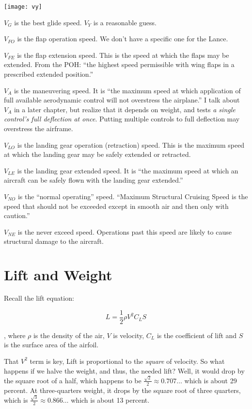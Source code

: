 \texttt{[image: vy]}

$V_G$ is the best glide speed. $V_Y$ is a reasonable guess.

$V_{FO}$ is the flap operation speed. We don't have a specific one for the Lance.

$V_{FE}$ is the flap extension speed. This is the speed at which the flaps may be extended. From the POH: ``the highest speed permissible with wing flaps in a prescribed extended position.''

$V_A$ is the maneuvering speed. It is ``the maximum speed at which application of full available aerodynamic control will not overstress the airplane.'' I talk about $V_A$ in a later chapter, but realize that it depends on weight, and tests \emph{a single control's full deflection at once}. Putting multiple controls to full deflection may overstress the airframe.

$V_{LO}$ is the landing gear operation (retraction) speed. This is the maximum speed at which the landing gear may be safely extended or retracted.

$V_{LE}$ is the landing gear extended speed. It is ``the maximum speed at which an aircraft can be safely flown with the landing gear extended.''

$V_{NO}$ is the ``normal operating'' speed. ``Maximum Structural Cruising Speed is the speed that should not be exceeded except in smooth air and then only with caution.''

$V_{NE}$ is the never exceed speed. Operations past this speed are likely to cause structural damage to the aircraft.

\section{Lift and Weight}

Recall the lift equation:

\begin{equation}
L = \frac{1}{2} \rho V^2 C_L S
\end{equation}

, where $\rho$ is the density of the air, $V$ is velocity, $C_L$ is the coefficient of lift and $S$ is the surface area of the airfoil.

That $V^2$ term is key, Lift is proportional to the \emph{square} of velocity. So what happens if we halve the weight, and thus, the needed lift? Well, it would drop by the square root of a half, which happens to be $\frac{\sqrt{2}}{2} \approx 0.707\ldots$ which is about 29 percent. At three-quarters weight, it drops by the square root of three quarters, which is $\frac{\sqrt{3}}{2} \approx 0.866\ldots$ which is about 13 percent.

